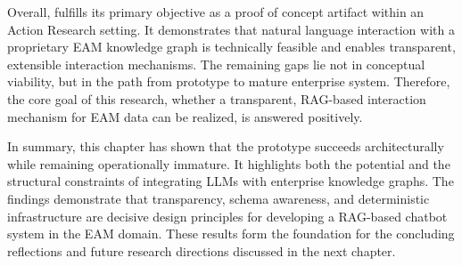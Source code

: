 Overall, \prototype{} fulfills its primary objective as a proof of concept artifact within an Action Research setting. It demonstrates that natural language interaction with a proprietary EAM knowledge graph is technically feasible and enables transparent, extensible interaction mechanisms. The remaining gaps lie not in conceptual viability, but in the path from prototype to mature enterprise system. Therefore, the core goal of this research, whether a transparent, RAG-based interaction mechanism for EAM data can be realized, is answered positively.


In summary, this chapter has shown that the prototype succeeds architecturally while remaining operationally immature. It highlights both the potential and the structural constraints of integrating LLMs with enterprise knowledge graphs. The findings demonstrate that transparency, schema awareness, and deterministic infrastructure are decisive design principles for developing a RAG-based chatbot system in the EAM domain. These results form the foundation for the concluding reflections and future research directions discussed in the next chapter.

